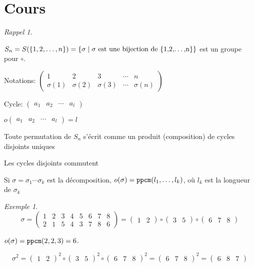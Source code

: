 \documentclass{report}
\newcounter{cours}
\newcommand*{\cours}{\section*{Cours \thecours}\stepcounter{cours}}
\theoremstyle{definition}
\theoremstyle{remark}
\newtheorem*{exem}{Exemple}
\newtheorem*{rappel}{Rappel}
\begin{document}
	\cours
	\begin{rappel}
		~

		\begin{ulist}
			\item $S_n = S(\{1,2,\dots,n\}) = \{\sigma \mid \sigma \text{ est une bijection de \{1,2,\dots,n\}}\}$ est un groupe pour $\circ$.
			\item Notations: $\begin{pmatrix}
				1&2&3&\dotsb&n\\
				\sigma(1)&\sigma(2)&\sigma(3)&\dotsb&\sigma(n)
			\end{pmatrix}$

			Cycle: $\begin{pmatrix}
				a_1&a_2&\dotsb&a_l
			\end{pmatrix}$
			\item $o\begin{pmatrix}
				a_1&a_2&\dotsb&a_l
			\end{pmatrix} = l$
			\item Toute permutation de $S_n$ s'\'ecrit comme un produit (composition) de cycles disjoints uniques
			\item Les cycles disjoints commutent
			\item Si $\sigma = \sigma_1 \dotsb \sigma_k$ est la d\'ecomposition, $o(\sigma) = \verb|ppcm|(l_1, \dots, l_k)$, o\`u $l_k$ est la longueur de $\sigma_k$
		\end{ulist}
	\end{rappel}
	\begin{exem}
		\[
		\sigma = \begin{pmatrix}
			1&2&3&4&5&6&7&8\\
			2&1&5&4&3&7&8&6
		\end{pmatrix} = \begin{pmatrix}
			1&2
		\end{pmatrix} \circ \begin{pmatrix}
			3&5
		\end{pmatrix} \circ \begin{pmatrix}
			6&7&8
		\end{pmatrix}
		\]

		$o(\sigma) = \verb|ppcm|(2,2,3) = 6$.

		\[
		\sigma^2 = \begin{pmatrix}
			1&2
		\end{pmatrix}^2 \circ \begin{pmatrix}
			3&5
		\end{pmatrix}^2 \circ \begin{pmatrix}
			6&7&8
		\end{pmatrix}^2 = \begin{pmatrix}
			6&7&8
		\end{pmatrix}^2 = \begin{pmatrix}
			6&8&7
		\end{pmatrix}
		\]
	\end{exem}
\end{document}
